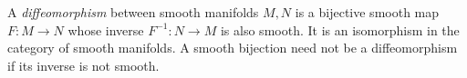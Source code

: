
A \emph{diffeomorphism} between smooth manifolds $M,N$ is a bijective smooth map $F:M\to N$ whose inverse $F^{-1}:N\to M$ is also smooth. It is an isomorphism in the category of smooth manifolds. A smooth bijection need not be a diffeomorphism if its inverse is not smooth.
